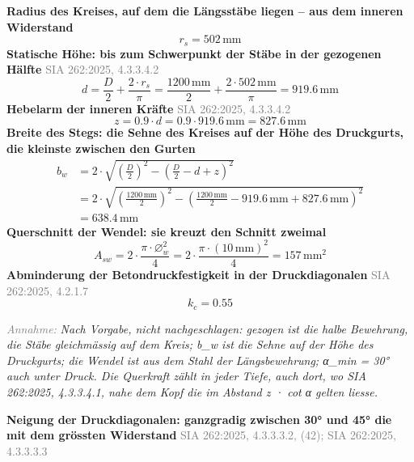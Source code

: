 \documentclass[11pt,a4paper]{article}
\newcommand{\normref}[1]{{\small\textcolor{gray}{#1}}}
\newcommand{\hinweis}[2]{\par\noindent\textcolor{gray}{\textit{#1:}} \textit{#2}\par}
\begin{document}
\noindent\textbf{Radius des Kreises, auf dem die Längsstäbe liegen -- aus dem inneren Widerstand}
\begin{equation*}
r_s = 502\,\mathrm{mm}
\end{equation*}
\noindent\textbf{Statische Höhe: bis zum Schwerpunkt der Stäbe in der gezogenen Hälfte} \hfill \normref{SIA 262:2025, 4.3.3.4.2}
\begin{equation*}
d = \frac{D}{2} + \frac{2 \cdot r_s}{\pi} = \frac{1200\,\mathrm{mm}}{2} + \frac{2 \cdot 502\,\mathrm{mm}}{\pi} = 919.6\,\mathrm{mm}
\end{equation*}
\noindent\textbf{Hebelarm der inneren Kräfte} \hfill \normref{SIA 262:2025, 4.3.3.4.2}
\begin{equation*}
z = 0.9 \cdot d = 0.9 \cdot 919.6\,\mathrm{mm} = 827.6\,\mathrm{mm}
\end{equation*}
\noindent\textbf{Breite des Stegs: die Sehne des Kreises auf der Höhe des Druckgurts, die kleinste zwischen den Gurten}
\begin{equation*}
\begin{aligned}
  b_w &= 2 \cdot \sqrt{\left(\frac{D}{2}\right)^{2} - \left(\frac{D}{2} - d + z\right)^{2}} \\
  &= 2 \cdot \sqrt{\left(\frac{1200\,\mathrm{mm}}{2}\right)^{2} - \left(\frac{1200\,\mathrm{mm}}{2} - 919.6\,\mathrm{mm} + 827.6\,\mathrm{mm}\right)^{2}} \\
  &= 638.4\,\mathrm{mm}
\end{aligned}
\end{equation*}
\noindent\textbf{Querschnitt der Wendel: sie kreuzt den Schnitt zweimal}
\begin{equation*}
A_{sw} = 2 \cdot \frac{\pi \cdot \varnothing_w^{2}}{4} = 2 \cdot \frac{\pi \cdot \left(10\,\mathrm{mm}\right)^{2}}{4} = 157\,\mathrm{mm}^{2}
\end{equation*}
\noindent\textbf{Abminderung der Betondruckfestigkeit in der Druckdiagonalen} \hfill \normref{SIA 262:2025, 4.2.1.7}
\begin{equation*}
k_c = 0.55
\end{equation*}
\hinweis{Annahme}{Nach Vorgabe, nicht nachgeschlagen: gezogen ist die halbe Bewehrung, die Stäbe gleichmässig auf dem Kreis; b\_w ist die Sehne auf der Höhe des Druckgurts; die Wendel ist aus dem Stahl der Längsbewehrung; α\_min = 30° auch unter Druck. Die Querkraft zählt in jeder Tiefe, auch dort, wo SIA 262:2025, 4.3.3.4.1, nahe dem Kopf die im Abstand z · cot α gelten liesse.}
\noindent\textbf{Neigung der Druckdiagonalen: ganzgradig zwischen 30° und 45° die mit dem grössten Widerstand} \hfill \normref{SIA 262:2025, 4.3.3.3.2, (42); SIA 262:2025, 4.3.3.3.3}
\end{document}
